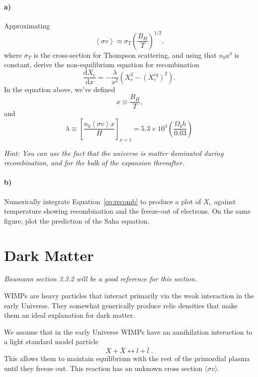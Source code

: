 \documentclass[12pt]{article}
\newcommand\diff{\mathrm{d}}
\begin{document}
\paragraph{a)} Approximating
\begin{equation}
    \left<\sigma v\right> \approx \sigma_T \left(\frac{B_H}{T}\right)^{1/2} \text{,}
\end{equation}
where $\sigma_T$ is the cross-section for Thompson scattering, and using that
$n_b a^3$ is constant, derive the non-equilibrium equation for recombination
\begin{equation}
    \frac{\diff X_e}{\diff x} = -\frac{\lambda}{x^2}
    \left(X_e^2 - (X_e^{eq})^2\right) \text{.}
    \label{eq:recomb}
\end{equation}
In the equation above, we've defined
\begin{equation}
    x \equiv \frac{B_H}{T} \text{,}
\end{equation}
and
\begin{equation}
    \lambda \equiv \left[\frac{n_b\left<\sigma v\right> x}{H}\right]_{x=1}
    = 5.3 \times 10^4 \left(\frac{\Omega_b h}{0.03}\right)
\end{equation}

\emph{Hint: You can use the fact that the universe is matter dominated during recombination, and for the bulk of the expansion thereafter.}

\paragraph{b)} Numerically integrate Equation~\ref{eq:recomb} to produce a plot
of $X_e$ against temperature showing recombination and the freeze-out of
electrons. On the same figure, plot the prediction of the Saha equation.


\section{Dark Matter}

\emph{Baumann section 3.3.2 will be a good reference for this section.}
\newcommand{\sigv}{\langle \sigma v \rangle}

WIMPs are heavy particles that interact primarily via the weak interaction in the early Universe. They somewhat generically produce relic densities that make them an ideal explanation for dark matter.

We assume that in the early Universe WIMPs have an annihilation interaction to a light standard model particle
\begin{equation}
    X + \bar{X} \leftrightarrow l + \bar{l} \; .
\end{equation}
This allows them to maintain equilibrium with the rest of the primordial plasma until they freeze out. This reaction has an unknown cross section $\sigv$.
\end{document}
